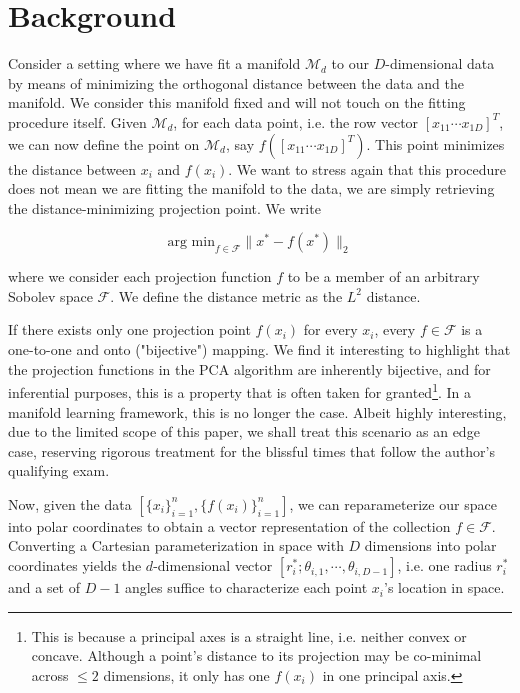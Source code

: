 \documentclass[twoside,11pt]{article}
\begin{document}
\section{Background}\label{sc:background}

Consider a setting where we have fit a manifold $\mathcal{M}_d$ to our $D$-dimensional data by means of minimizing the orthogonal distance between the data and the manifold. We consider this manifold fixed and will not touch on the fitting procedure itself. Given $\mathcal{M}_d$, for each data point, i.e. the row vector $[x_{11} \cdots x_{1D}]^T$, we can now define the point on $\mathcal{M}_d$, say $f\left(\left[x_{11} \cdots x_{1D}\right]^T\right)$. This point minimizes the distance between $x_i$ and $f(x_i)$. We want to stress again that this procedure does not mean we are fitting the manifold to the data, we are simply retrieving the distance-minimizing projection point. We write 

$$
\text{arg~min}_{f \in \mathcal{F}} \|x^* - f(x^*)\|_2
$$

where we consider each projection function $f$ to be a member of an arbitrary Sobolev space $\mathcal{F}$. We define the distance metric as the $L^2$ distance. 

If there exists only one projection point $f(x_i)$ for every $x_i$, every $f \in \mathcal{F}$ is a one-to-one and onto ("bijective") mapping. We find it interesting to highlight that the projection functions in the PCA algorithm are inherently bijective, and for inferential purposes, this is a property that is often taken for granted\footnote{This is because a principal axes is a straight line, i.e. neither convex or concave. Although a point's distance to its projection may be co-minimal across $\leq 2$ dimensions, it only has one $f(x_i)$ in one principal axis.}. In a manifold learning framework, this is no longer the case. Albeit highly interesting, due to the limited scope of this paper, we shall treat this scenario as an edge case, reserving rigorous treatment for the blissful times that follow the author's qualifying exam. 

Now, given the data $[\{x_i\}_{i=1}^n, \{f(x_i)\}_{i=1}^n]$, we can reparameterize our space into polar coordinates to obtain a vector representation of the collection $f \in \mathcal{F}$. Converting a Cartesian parameterization in space with $D$ dimensions into polar coordinates yields the $d$-dimensional vector $[r_i^*; \theta_{i, 1}, \cdots, \theta_{i, D-1}]$, i.e. one radius $r_i^*$ and a set of $D-1$ angles suffice to characterize each point $x_i$'s location in space. 
\end{document}
